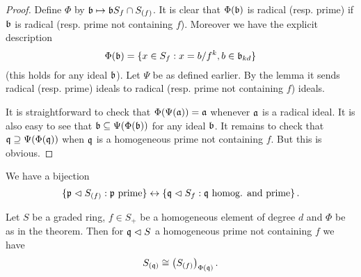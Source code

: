 \documentclass{memoir}
\begin{document}
\begin{proof}
    Define $\Phi$ by $\mathfrak{b}\mapsto \mathfrak{b}S_f\cap S_{(f)}$.
    It is clear that $\Phi(\mathfrak{b})$ is radical (resp. prime) if $\mathfrak{b}$ is radical (resp. prime not containing $f$).
    Moreover we have the explicit description
    \begin{equation}
        \Phi(\mathfrak{b}) = \lbrace x\in S_f: x = b/f^k, b\in \mathfrak{b}_{kd}\rbrace
    \end{equation}
    (this holds for any ideal $\mathfrak{b}$).
    Let $\Psi$ be as defined earlier.
    By the lemma it sends radical (resp. prime) ideals to radical (resp. prime not containing $f$) ideals.

    It is straightforward to check that $\Phi(\Psi(\mathfrak{a})) = \mathfrak{a}$ whenever $\mathfrak{a}$ is a radical ideal.
    It is also easy to see that $\mathfrak{b} \subseteq \Psi(\Phi(\mathfrak{b}))$ for any ideal $\mathfrak{b}$.
    It remains to check that $\mathfrak{q} \supseteq \Psi(\Phi(\mathfrak{q}))$ when $\mathfrak{q}$ is a homogeneous prime not containing $f$.
    But this is obvious.
\end{proof}
\begin{corollary}
    We have a bijection 
    \begin{equation}
        \lbrace\mathfrak{p} \vartriangleleft S_{(f)}: \mathfrak{p}\text{ prime}\rbrace \leftrightarrow \left\{\mathfrak{q} \vartriangleleft S_f : \mathfrak{q} \text{ homog. and prime} \right\}.
    \end{equation}
\end{corollary}
\begin{proposition}
    Let $S$ be a graded ring, $f\in S_+$ be a homogeneous element of degree $d$ and $\Phi$ be as in the theorem.
    Then for $\mathfrak{q}\vartriangleleft S$ a homogeneous prime not containing $f$ we have 
    \begin{equation}
        S_{(\mathfrak{q})} \cong \left(S_{(f)}\right)_{\Phi(\mathfrak{q})}.
    \end{equation}
\end{proposition}
\end{document}
